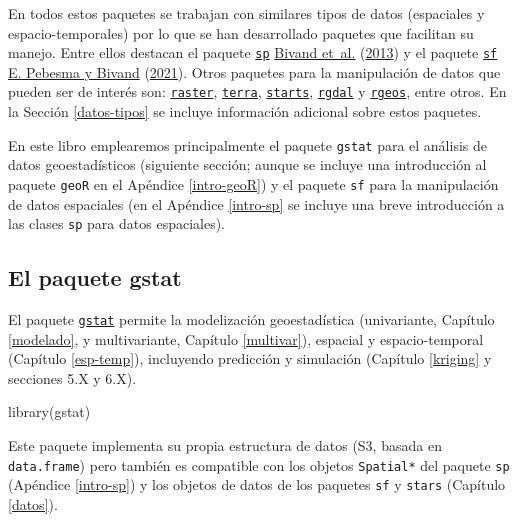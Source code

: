 \documentclass[
  spanish,
]{book}
\newenvironment{Shaded}{\begin{snugshade}}{\end{snugshade}}
\newcommand{\FunctionTok}[1]{\textcolor[rgb]{0.00,0.00,0.00}{#1}}
\newcommand{\NormalTok}[1]{#1}
\theoremstyle{break}
\theoremstyle{definition}
\theoremstyle{definition}
\theoremstyle{definition}
\theoremstyle{definition}
\theoremstyle{remark}
\begin{document}
En todos estos paquetes se trabajan con similares tipos de datos (espaciales y espacio-temporales) por lo que se han desarrollado paquetes que facilitan su manejo.
Entre ellos destacan el paquete \href{https://CRAN.R-project.org/package=sp}{\texttt{sp}} \protect\hyperlink{ref-Bivand2013}{Bivand et~al.} (\protect\hyperlink{ref-Bivand2013}{2013}) y el paquete \href{https://r-spatial.github.io/sf}{\texttt{sf}} \protect\hyperlink{ref-Pebesma2021}{E. Pebesma y Bivand} (\protect\hyperlink{ref-Pebesma2021}{2021}).
Otros paquetes para la manipulación de datos que pueden ser de interés son: \href{https://CRAN.R-project.org/package=raster}{\texttt{raster}}, \href{https://CRAN.R-project.org/package=terra}{\texttt{terra}}, \href{https://r-spatial.github.io/stars}{\texttt{starts}}, \href{https://CRAN.R-project.org/package=rgdal}{\texttt{rgdal}} y \href{https://CRAN.R-project.org/package=rgeos}{\texttt{rgeos}}, entre otros.
En la Sección \ref{datos-tipos} se incluye información adicional sobre estos paquetes.

En este libro emplearemos principalmente el paquete \texttt{gstat} para el análisis de datos geoestadísticos (siguiente sección; aunque se incluye una introducción al paquete \texttt{geoR} en el Apéndice \ref{intro-geoR}) y el paquete \texttt{sf} para la manipulación de datos espaciales (en el Apéndice \ref{intro-sp} se incluye una breve introducción a las clases \texttt{sp} para datos espaciales).

\hypertarget{gstat-pkg}{%
\subsection{\texorpdfstring{El paquete \textbf{gstat}}{El paquete gstat}}\label{gstat-pkg}}

El paquete \href{https://r-spatial.github.io/gstat}{\texttt{gstat}} permite la modelización geoestadística (univariante, Capítulo \ref{modelado}, y multivariante, Capítulo \ref{multivar}), espacial y espacio-temporal (Capítulo \ref{esp-temp}), incluyendo predicción y simulación (Capítulo \ref{kriging} y secciones 5.X y 6.X).

\begin{Shaded}
\begin{Highlighting}[]
\FunctionTok{library}\NormalTok{(gstat)}
\end{Highlighting}
\end{Shaded}

Este paquete implementa su propia estructura de datos (S3, basada en \texttt{data.frame}) pero también es compatible con los objetos \texttt{Spatial*} del paquete \texttt{sp} (Apéndice \ref{intro-sp}) y los objetos de datos de los paquetes \texttt{sf} y \texttt{stars} (Capítulo \ref{datos}).
\end{document}
